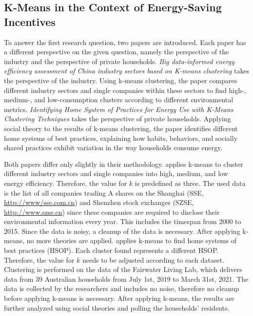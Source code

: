 \subsection{K-Means in the Context of Energy-Saving Incentives}
To answer the first research question, two papers are introduced.
Each paper has a different perspective on the given question, namely the perspective of the industry and the perspective of private households.
\textit{Big data-informed energy efficiency assessment of China industry sectors based on K-means clustering} \cite{LIU-BDE} takes the perspective of the industry.
Using k-means clustering, the paper compares different industry sectors and single companies within these sectors to find high-, medium-, and low-consumption clusters according to different environmental metrics.
\textit{Identifying Home System of Practices for Energy Use with K-Means Clustering Techniques} \cite{MAL-HBP} takes the perspective of private households.
Applying social theory to the results of k-means clustering, the paper identifies different home systems of best practices, explaining how habits, behaviors, and socially shared practices exhibit variation in the way households consume energy.

Both papers differ only slightly in their methodology.
\cite{LIU-BDE} applies k-means to cluster different industry sectors and single companies into high, medium, and low energy efficiency.
Therefore, the value for $k$ is predefined as three.
The used data is the list of all companies trading A shares on the Shanghai (SSE, \url{http://www/sse.com.cn}) and Shenzhen stock exchanges (SZSE, \url{http://www.szse.cn}) since these companies are required to disclose their environmental information every year.
This includes the timespan from 2000 to 2015.
Since the data is noisy, a cleanup of the data is necessary.
After applying k-means, no more theories are applied.
\cite{MAL-HBP} applies k-means to find home systems of best practices (HSOP).
Each cluster found represents a different HSOP.
Therefore, the value for $k$ needs to be adjusted according to each dataset.
Clustering is performed on the data of the Fairwater Living Lab, which delivers data from 39 Australian households from July 1st, 2019 to March 31st, 2021. 
The data is collected by the researchers and includes no noise, therefore no cleanup before applying k-means is necessary.
After applying k-means, the results are further analyzed using social theories and polling the households' residents.


